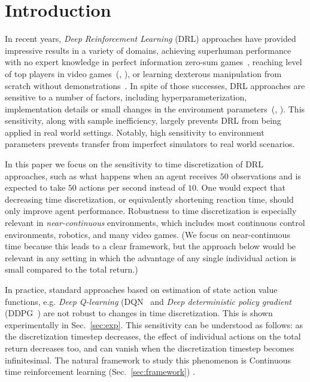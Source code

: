 
\section{Introduction}
\label{sec:intro}
In recent years, \emph{Deep Reinforcement Learning} (DRL) approaches have
provided impressive results in a variety of domains, achieving superhuman
performance with no expert knowledge in perfect information zero-sum
games~\cite{alphazero}, reaching level of top players in video
games~(\citealt{openai_five}, \citealt{dqn}), or learning dexterous manipulation
from scratch without demonstrations~\cite{hand_control}. 
In spite of those successes, DRL approaches are
sensitive to a number of factors, including hyperparameterization,
implementation details or small changes in the environment
parameters~(\citealt{drl_matter}, \citealt{drl_matter_bis}). This sensitivity,
along with sample inefficiency, largely prevents DRL from being applied in real
world settings. Notably, high sensitivity to environment parameters prevents
transfer from imperfect simulators to real world scenarios.

In this paper we focus on the sensitivity to time discretization of DRL
approaches, such as what happens when an agent receives $50$ observations
and is expected to take $50$ actions per second instead of $10$. One
would expect that decreasing time discretization, or equivalently
shortening reaction time, should only improve agent performance.
Robustness to time discretization is especially relevant in
\emph{near-continuous} environments, which includes most continuous
control environments, robotics, and many video games.  (We focus on
near-continuous time because this leads to a clear framework, but the
approach below would be relevant in any setting in which the advantage of
any single individual action is small compared to the total return.)%

In practice, standard approaches based on estimation of state action value functions, e.g.
\emph{Deep Q-learning} (DQN~\citep{dqn} and \emph{Deep deterministic policy
gradient} (DDPG~\citep{ddpg}) are not robust to changes in time discretization. This is shown experimentally in Sec.~\ref{sec:exp}. 
This sensitivity can be understood as follows: as the discretization timestep
decreases, the effect of individual actions on the total return decreases too, and
can vanish when the discretization timestep becomes infinitesimal. The natural
framework to study this phenomenon is Continuous time reinforcement learning 
(Sec.~\ref{sec:framework}) \cite{cont_rl, adv_upd}.

